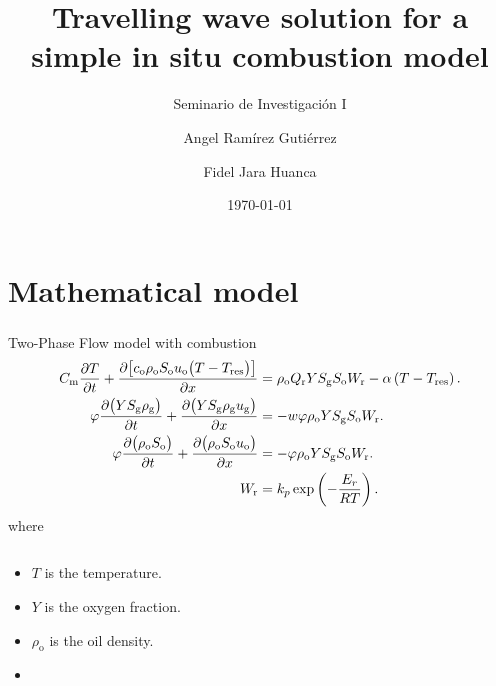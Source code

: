 \documentclass[
    8pt,
    aspectratio=1610,
    c,
    intlimits,
    leqno,
    professionalfonts,
]{beamer}
\title{Travelling wave solution for a simple in situ combustion model}
\subtitle{Seminario de Investigación I}
\author{Angel Ramírez Gutiérrez \and Fidel Jara Huanca}
\institute{\small Instituto de Matemática y Ciencias Afines}
\date{\today}
\begin{document}
\begin{frame}
	\titlepage
\end{frame}

\section{Mathematical model}

\begin{frame}
	\frametitle{\secname}

	\begin{block}{Two-Phase Flow model with combustion~\cite{Gargar2020}}
		\begin{align}
			C_{\text{m}}
			\diffp{T}{t}+
			\diffp{
				\big[
					c_{\text{o}}
					\rho_{\text{o}}
					S_{\text{o}}
					u_{\text{o}}
					\big(
					T-T_{\text{res}}
					\big)
					\big]
			}{x}                                                          & =
			\rho_{\text{o}}
			Q_{\text{r}}
			Y
			S_{\text{g}}
			S_{\text{o}}
			W_{\text{r}}-
			\alpha
			\left(T-T_{\text{res}}\right).                                    \\
			\varphi
			\diffp{\big(YS_{\text{g}}\rho_{\text{g}}\big)}{t}+
			\diffp{\big(YS_{\text{g}}\rho_{\text{g}}u_{\text{g}}\big)}{x} & =
			-w\varphi\rho_{\text{o}}YS_{\text{g}}S_{\text{o}}W_{\text{r}}.    \\
			\varphi
			\diffp{\big(\rho_{\text{o}}S_{\text{o}}\big)}{t}+
			\diffp{\big(\rho_{\text{o}}S_{\text{o}}u_{\text{o}}\big)}{x}
			                                                              & =
			-\varphi\rho_{\text{o}}YS_{\text{g}}S_{\text{o}}W_{\text{r}}.     \\
			W_{\text{r}}                                                  & =
			k_{p}
			\exp
			\left(
			-\frac{E_{r}}{RT}
			\right).
		\end{align}
		where
		\begin{columns}
			\begin{column}{.3\paperwidth}
				\begin{itemize}
					\item

					      $T$ is the temperature.

					\item

					      $Y$ is the oxygen fraction.

					\item

					      $\rho_{\text{o}}$ is the oil density.

					\item


\end{itemize}
\end{column}
\end{columns}
\end{block}
\end{frame}
\end{document}
